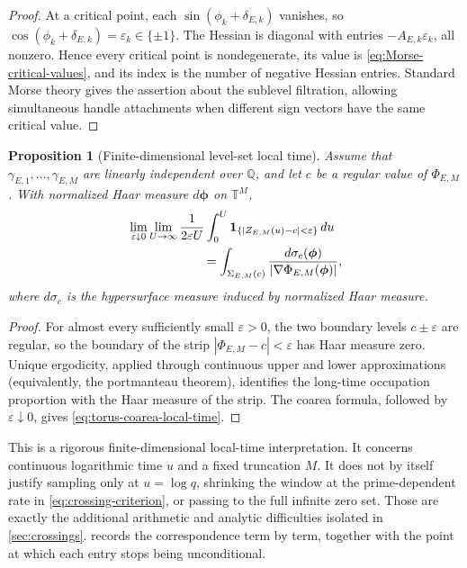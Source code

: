 \documentclass[11pt,reqno]{amsart}
\newtheorem{proposition}{Proposition}
\theoremstyle{remark}
\newcommand{\Q}{\mathbb{Q}}
\newcommand{\T}{\mathbb{T}}
\begin{document}
\begin{proof}
At a critical point, each $\sin(\phi_k+\delta_{E,k})$ vanishes, so $\cos(\phi_k+\delta_{E,k})=\varepsilon_k\in\{\pm1\}$.  The Hessian is diagonal with entries $-A_{E,k}\varepsilon_k$, all nonzero.  Hence every critical point is nondegenerate, its value is \eqref{eq:Morse-critical-values}, and its index is the number of negative Hessian entries.  Standard Morse theory gives the assertion about the sublevel filtration, allowing simultaneous handle attachments when different sign vectors have the same critical value.
\end{proof}

\begin{proposition}[Finite-dimensional level-set local time]
\label{prop:torus-local-time}
Assume that $\gamma_{E,1},\ldots,\gamma_{E,M}$ are linearly independent over $\Q$, and let $c$ be a regular value of $\Phi_{E,M}$.  With normalized Haar measure $d\boldsymbol\phi$ on $\T^M$,
\begin{align}
 &\lim_{\varepsilon\downarrow0}
  \lim_{U\to\infty}
  \frac{1}{2\varepsilon U}
  \int_0^U
  \mathbf 1_{\{|Z_{E,M}(u)-c|<\varepsilon\}}\,du
  \notag\\
 &\hspace{6em}
  =\int_{\Sigma_{E,M}(c)}
  \frac{d\sigma_c(\boldsymbol\phi)}
  {|\nabla\Phi_{E,M}(\boldsymbol\phi)|},
  \label{eq:torus-coarea-local-time}
\end{align}
where $d\sigma_c$ is the hypersurface measure induced by normalized Haar measure.
\end{proposition}

\begin{proof}
For almost every sufficiently small $\varepsilon>0$, the two boundary levels $c\pm\varepsilon$ are regular, so the boundary of the strip $|\Phi_{E,M}-c|<\varepsilon$ has Haar measure zero.  Unique ergodicity, applied through continuous upper and lower approximations (equivalently, the portmanteau theorem), identifies the long-time occupation proportion with the Haar measure of the strip.  The coarea formula, followed by $\varepsilon\downarrow0$, gives \eqref{eq:torus-coarea-local-time}.
\end{proof}

This is a rigorous finite-dimensional local-time interpretation.  It concerns continuous logarithmic time $u$ and a fixed truncation $M$.  It does not by itself justify sampling only at $u=\log q$, shrinking the window at the prime-dependent rate in \eqref{eq:crossing-criterion}, or passing to the full infinite zero set.  Those are exactly the additional arithmetic and analytic difficulties isolated in \cref{sec:crossings}.   records the correspondence term by term, together with the point at which each entry stops being unconditional.
\end{document}
